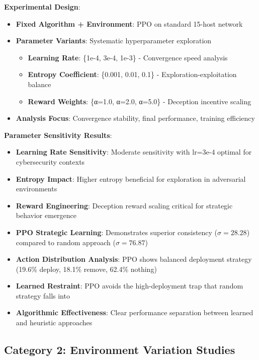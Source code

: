 \documentclass[12pt,oneside]{article}
\begin{document}
\textbf{Experimental Design}:
\begin{itemize}
\item \textbf{Fixed Algorithm + Environment}: PPO on standard 15-host network
\item \textbf{Parameter Variants}: Systematic hyperparameter exploration
  \begin{itemize}
    \item \textbf{Learning Rate}: \{1e-4, 3e-4, 1e-3\} - Convergence speed analysis
    \item \textbf{Entropy Coefficient}: \{0.001, 0.01, 0.1\} - Exploration-exploitation balance
    \item \textbf{Reward Weights}: \{α=1.0, α=2.0, α=5.0\} - Deception incentive scaling
  \end{itemize}
\item \textbf{Analysis Focus}: Convergence stability, final performance, training efficiency
\end{itemize}

\textbf{Parameter Sensitivity Results}:
\begin{itemize}
\item \textbf{Learning Rate Sensitivity}: Moderate sensitivity with lr=3e-4 optimal for cybersecurity contexts
\item \textbf{Entropy Impact}: Higher entropy beneficial for exploration in adversarial environments
\item \textbf{Reward Engineering}: Deception reward scaling critical for strategic behavior emergence
\end{itemize}
\begin{itemize}
\item \textbf{PPO Strategic Learning}: Demonstrates superior consistency ($\sigma=28.28$) compared to random approach ($\sigma=76.87$)
\item \textbf{Action Distribution Analysis}: PPO shows balanced deployment strategy (19.6\% deploy, 18.1\% remove, 62.4\% nothing)
\item \textbf{Learned Restraint}: PPO avoids the high-deployment trap that random strategy falls into
\item \textbf{Algorithmic Effectiveness}: Clear performance separation between learned and heuristic approaches
\end{itemize}

\subsection{Category 2: Environment Variation Studies}
\end{document}
